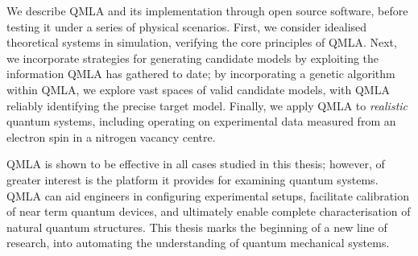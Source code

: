 We describe QMLA and its implementation through open source software,
    before testing it under a series of physical scenarios.
First, we consider idealised theoretical systems in simulation, 
    verifying the core principles of QMLA. 
Next, we incorporate strategies for generating candidate models
    by exploiting the information QMLA has gathered to date;
    by incorporating a genetic algorithm within QMLA, 
    we explore vast spaces of valid candidate models, with QMLA reliably identifying the precise target model.
Finally, we apply QMLA to \emph{realistic} quantum systems, 
    including operating on experimental data measured from an electron spin in a nitrogen vacancy centre. 

\par 

QMLA is shown to be effective in all cases studied in this thesis;
    however, of greater interest is the platform it provides for examining quantum systems.
QMLA can aid engineers in configuring experimental setups, 
    facilitate calibration of near term quantum devices,
    and ultimately enable complete characterisation of natural quantum structures.
This thesis marks the beginning of a new line of research, 
    into automating the understanding of quantum mechanical systems.
